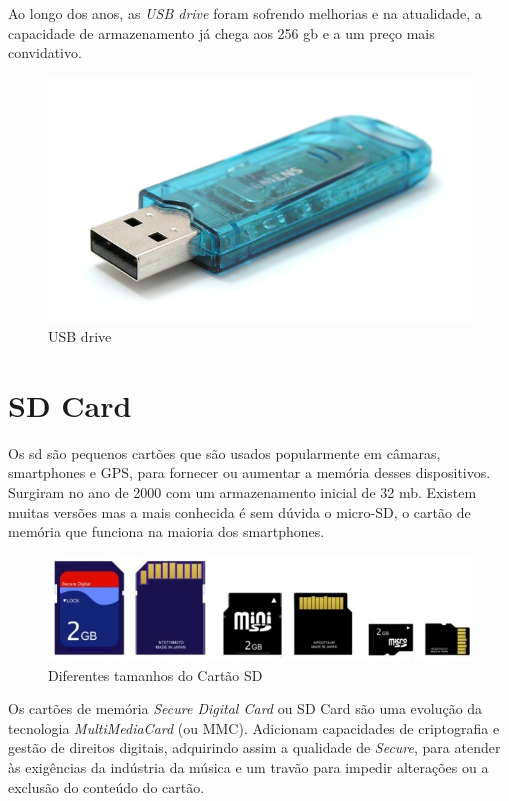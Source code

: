 \documentclass{report}
\begin{document}
		Ao longo dos anos, as \textit{USB drive} foram sofrendo melhorias e na atualidade, a capacidade de armazenamento já chega aos 256 \ac{gb} e a um preço mais convidativo.
		
	\begin{figure} [h]
		\centering
		\includegraphics[scale=0.3]{usb_drive.jpg}
		\caption{USB drive}
	\end{figure}		

\newpage
		
		\section{SD Card}
		
	Os \ac{sd} são pequenos cartões que são usados popularmente em câmaras, smartphones e GPS, para fornecer ou aumentar a memória desses dispositivos. Surgiram no ano de 2000 com um armazenamento inicial de 32 \ac{mb}. Existem muitas versões mas a mais conhecida é sem dúvida o micro-SD, o cartão de memória que funciona na maioria dos smartphones.
\vspace{1mm}

	\begin{figure} [h]
		\centering
		\includegraphics[scale=0.6]{sdcardsizes.jpg}
		\caption{Diferentes tamanhos do Cartão SD}
	\end{figure}
	
	Os cartões de memória \textit{Secure Digital Card}  ou SD Card são uma evolução da tecnologia \textit{MultiMediaCard} (ou MMC). Adicionam capacidades de criptografia e gestão de direitos digitais, adquirindo assim a qualidade de \textit{Secure}, para atender às exigências da indústria da música e um travão para impedir alterações ou a exclusão do conteúdo do cartão.
\vspace{1mm}
\end{document}
